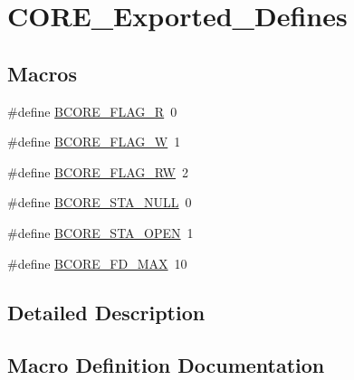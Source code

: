 \hypertarget{group___c_o_r_e___exported___defines}{}\section{C\+O\+R\+E\+\_\+\+Exported\+\_\+\+Defines}
\label{group___c_o_r_e___exported___defines}
\subsection*{Macros}
\begin{DoxyCompactItemize}
\item 
\#define \mbox{\hyperlink{group___c_o_r_e___exported___defines_ga9632edfe3a6652c254922f0fc6e4315c}{B\+C\+O\+R\+E\+\_\+\+F\+L\+A\+G\+\_\+R}}~0
\item 
\#define \mbox{\hyperlink{group___c_o_r_e___exported___defines_ga5e134ab3ebc11db6d585cfc1a48aadf0}{B\+C\+O\+R\+E\+\_\+\+F\+L\+A\+G\+\_\+W}}~1
\item 
\#define \mbox{\hyperlink{group___c_o_r_e___exported___defines_ga0198147efa03609c64760662bd8ea00c}{B\+C\+O\+R\+E\+\_\+\+F\+L\+A\+G\+\_\+\+RW}}~2
\item 
\#define \mbox{\hyperlink{group___c_o_r_e___exported___defines_ga925f6e907905a6bb8722167d2557474d}{B\+C\+O\+R\+E\+\_\+\+S\+T\+A\+\_\+\+N\+U\+LL}}~0
\item 
\#define \mbox{\hyperlink{group___c_o_r_e___exported___defines_gacc7e4aa393f80aff9c3dbf5d974c8698}{B\+C\+O\+R\+E\+\_\+\+S\+T\+A\+\_\+\+O\+P\+EN}}~1
\item 
\#define \mbox{\hyperlink{group___c_o_r_e___exported___defines_ga940e3dead286914001d8cb4606edc023}{B\+C\+O\+R\+E\+\_\+\+F\+D\+\_\+\+M\+AX}}~10
\end{DoxyCompactItemize}


\subsection{Detailed Description}


\subsection{Macro Definition Documentation}
\mbox{\label{group___c_o_r_e___exported___defines_ga940e3dead286914001d8cb4606edc023}} 
